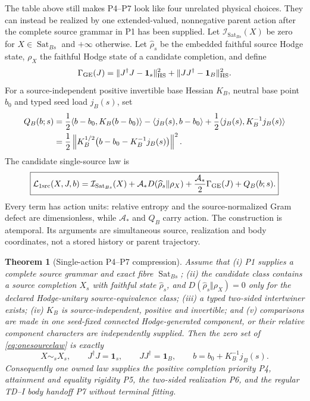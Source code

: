 \documentclass[11pt,a4paper]{article}
\newtheorem{theorem}[definition]{Theorem}
\theoremstyle{remark}
\newcommand{\Sat}{\operatorname{Sat}_{Bs}}
\newcommand{\id}{\mathbf 1}
\begin{document}
The table above still makes P4--P7 look like four unrelated physical choices.
They can instead be realized by one extended-valued, nonnegative parent action
after the complete source grammar in P1 has been supplied.  Let
$\mathcal I_{\Sat}(X)$ be zero for $X\in\Sat$ and $+\infty$ otherwise.  Let
$\widehat\rho_s$ be the embedded faithful source Hodge state, $\rho_X$ the
faithful Hodge state of a candidate completion, and define
\begin{equation}
 \Gamma_{\rm GE}(J)
 =\lVert J^\dagger J-\id_s\rVert_{\rm HS}^2
  +\lVert JJ^\dagger-\id_B\rVert_{\rm HS}^2 .
 \label{eq:gramglobal}
\end{equation}
For a source-independent positive invertible base Hessian $K_B$, neutral base
point $b_0$ and typed seed load $j_B(s)$, set
\begin{align}
 Q_B(b;s)
 &=\frac12\langle b-b_0,K_B(b-b_0)\rangle
   -\langle j_B(s),b-b_0\rangle
   +\frac12\langle j_B(s),K_B^{-1}j_B(s)\rangle \notag\\
 &=\frac12\left\lVert
 K_B^{1/2}\bigl(b-b_0-K_B^{-1}j_B(s)\bigr)
 \right\rVert^2 .
 \label{eq:bodysquare}
\end{align}
The candidate single-source law is
\begin{equation}
 \boxed{
 \mathcal L_{\rm 1src}(X,J,b)
 =\mathcal I_{\Sat}(X)
 +\mathcal A_*D(\widehat\rho_s\Vert\rho_X)
 +\frac{\mathcal A_*}{2}\Gamma_{\rm GE}(J)
 +Q_B(b;s).}
 \label{eq:onesourcelaw}
\end{equation}
Every term has action units: relative entropy and the source-normalized Gram
defect are dimensionless, while $\mathcal A_*$ and $Q_B$ carry action.  The
construction is atemporal.  Its arguments are simultaneous source,
realization and body coordinates, not a stored history or parent trajectory.

\begin{theorem}[Single-action P4--P7 compression]
Assume that (i) P1 supplies a complete source grammar and exact fibre $\Sat$;
(ii) the candidate class contains a source completion $X_s$ with faithful
state $\widehat\rho_s$, and
$D(\widehat\rho_s\Vert\rho_X)=0$ only for the declared Hodge-unitary
source-equivalence class; (iii) a typed two-sided intertwiner exists; (iv)
$K_B$ is source-independent, positive and invertible; and (v) comparisons are
made in one seed-fixed connected Hodge-generated component, or their relative
component characters are independently supplied.  Then the zero set of
\eqref{eq:onesourcelaw} is exactly
\begin{equation}
 X\sim_s X_s,\qquad
 J^\dagger J=\id_s,\qquad JJ^\dagger=\id_B,\qquad
 b=b_0+K_B^{-1}j_B(s).
 \label{eq:onesourcezero}
\end{equation}
Consequently one owned law supplies the positive completion priority P4,
attainment and equality rigidity P5, the two-sided realization P6, and the
regular TD--I body handoff P7 without terminal fitting.
\end{theorem}
\end{document}
